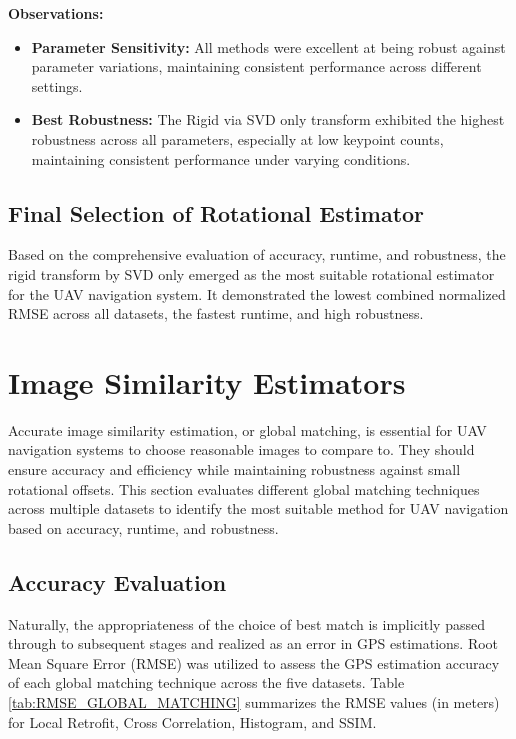 \textbf{Observations:}  
\begin{itemize}
    \item \textbf{Parameter Sensitivity:} All methods were excellent at being robust against parameter variations, maintaining consistent performance across different settings.
    \item \textbf{Best Robustness:} The Rigid via SVD only transform exhibited the highest robustness across all parameters, especially at low keypoint counts, maintaining consistent performance under varying conditions.

\end{itemize}

\subsection{Final Selection of Rotational Estimator}

Based on the comprehensive evaluation of accuracy, runtime, and robustness, the rigid transform by SVD only emerged as the most suitable rotational estimator for the UAV navigation system. It demonstrated the lowest combined normalized RMSE across all datasets, the fastest runtime, and high robustness. 

\section{Image Similarity Estimators}

Accurate image similarity estimation, or global matching, is essential for UAV navigation systems to choose reasonable images to compare to. They should ensure accuracy and efficiency while maintaining robustness against small rotational offsets. This section evaluates different global matching techniques across multiple datasets to identify the most suitable method for UAV navigation based on accuracy, runtime, and robustness.

\subsection{Accuracy Evaluation}

Naturally, the appropriateness of the choice of best match is implicitly passed through to subsequent stages and realized as an error in GPS estimations. Root Mean Square Error (RMSE) was utilized to assess the GPS estimation accuracy of each global matching technique across the five datasets. Table \ref{tab:RMSE_GLOBAL_MATCHING} summarizes the RMSE values (in meters) for Local Retrofit, Cross Correlation, Histogram, and SSIM.

